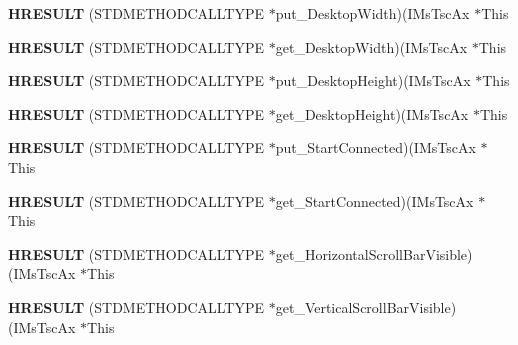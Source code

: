 \begin{DoxyCompactItemize}
\mbox{\label{struct_i_ms_tsc_ax_vtbl_acbd98f8783d9fc3c87d9ea9bc0ae51ad}} 
{\bfseries H\+R\+E\+S\+U\+LT} (S\+T\+D\+M\+E\+T\+H\+O\+D\+C\+A\+L\+L\+T\+Y\+PE $\ast$put\+\_\+\+Desktop\+Width)(I\+Ms\+Tsc\+Ax $\ast$This
\item 
\mbox{\label{struct_i_ms_tsc_ax_vtbl_aad3440b79e369dad9bb7bb5cf9d356fb}} 
{\bfseries H\+R\+E\+S\+U\+LT} (S\+T\+D\+M\+E\+T\+H\+O\+D\+C\+A\+L\+L\+T\+Y\+PE $\ast$get\+\_\+\+Desktop\+Width)(I\+Ms\+Tsc\+Ax $\ast$This
\item 
\mbox{\label{struct_i_ms_tsc_ax_vtbl_aa3fdd502e5044893dd1e343cdd5983ad}} 
{\bfseries H\+R\+E\+S\+U\+LT} (S\+T\+D\+M\+E\+T\+H\+O\+D\+C\+A\+L\+L\+T\+Y\+PE $\ast$put\+\_\+\+Desktop\+Height)(I\+Ms\+Tsc\+Ax $\ast$This
\item 
\mbox{\label{struct_i_ms_tsc_ax_vtbl_ad014df012a38258f6be676f4f2889bf3}} 
{\bfseries H\+R\+E\+S\+U\+LT} (S\+T\+D\+M\+E\+T\+H\+O\+D\+C\+A\+L\+L\+T\+Y\+PE $\ast$get\+\_\+\+Desktop\+Height)(I\+Ms\+Tsc\+Ax $\ast$This
\item 
\mbox{\label{struct_i_ms_tsc_ax_vtbl_adfff51e28a583f2d69befe3e978cb54f}} 
{\bfseries H\+R\+E\+S\+U\+LT} (S\+T\+D\+M\+E\+T\+H\+O\+D\+C\+A\+L\+L\+T\+Y\+PE $\ast$put\+\_\+\+Start\+Connected)(I\+Ms\+Tsc\+Ax $\ast$This
\item 
\mbox{\label{struct_i_ms_tsc_ax_vtbl_a4435a65ed2d709d50fa7e49eb040ca47}} 
{\bfseries H\+R\+E\+S\+U\+LT} (S\+T\+D\+M\+E\+T\+H\+O\+D\+C\+A\+L\+L\+T\+Y\+PE $\ast$get\+\_\+\+Start\+Connected)(I\+Ms\+Tsc\+Ax $\ast$This
\item 
\mbox{\label{struct_i_ms_tsc_ax_vtbl_aad5e6fc688e645028997e52f82e54648}} 
{\bfseries H\+R\+E\+S\+U\+LT} (S\+T\+D\+M\+E\+T\+H\+O\+D\+C\+A\+L\+L\+T\+Y\+PE $\ast$get\+\_\+\+Horizontal\+Scroll\+Bar\+Visible)(I\+Ms\+Tsc\+Ax $\ast$This
\item 
\mbox{\label{struct_i_ms_tsc_ax_vtbl_ab1db9fd5de423cb1b46188e793a398e4}} 
{\bfseries H\+R\+E\+S\+U\+LT} (S\+T\+D\+M\+E\+T\+H\+O\+D\+C\+A\+L\+L\+T\+Y\+PE $\ast$get\+\_\+\+Vertical\+Scroll\+Bar\+Visible)(I\+Ms\+Tsc\+Ax $\ast$This

\end{DoxyCompactItemize}
